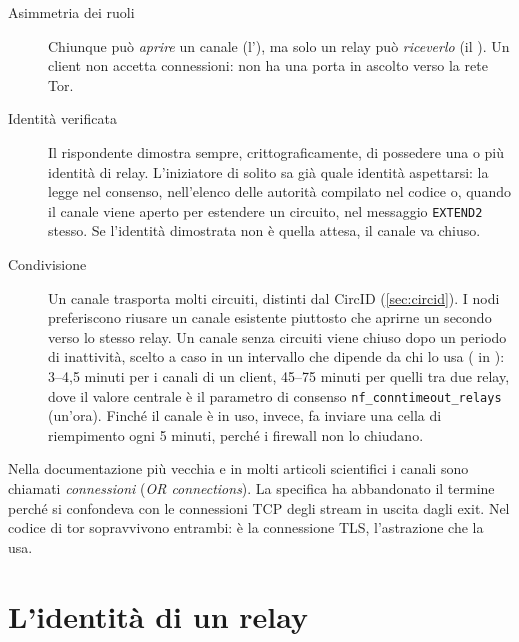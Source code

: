 \begin{description}
  \item[Asimmetria dei ruoli] Chiunque può \emph{aprire} un canale (l'), ma solo un relay può \emph{riceverlo} (il ). Un client non accetta connessioni: non ha una porta in ascolto verso la rete Tor.
  \item[Identità verificata] Il rispondente dimostra sempre, crittograficamente, di possedere una o più identità di relay. L'iniziatore di solito sa già quale identità aspettarsi: la legge nel consenso, nell'elenco delle autorità compilato nel codice o, quando il canale viene aperto per estendere un circuito, nel messaggio \texttt{EXTEND2} stesso. Se l'identità dimostrata non è quella attesa, il canale va chiuso.
  \item[Condivisione] Un canale trasporta molti circuiti, distinti dal CircID (\cref{sec:circid}). I nodi preferiscono riusare un canale esistente piuttosto che aprirne un secondo verso lo stesso relay. Un canale senza circuiti viene chiuso dopo un periodo di inattività, scelto a caso in un intervallo che dipende da chi lo usa ( in ): 3--4,5 minuti per i canali di un client, 45--75 minuti per quelli tra due relay, dove il valore centrale è il parametro di consenso \texttt{nf\_conntimeout\_relays} (un'ora). Finché il canale è in uso, invece,  fa inviare una cella di riempimento ogni 5 minuti, perché i firewall non lo chiudano.
\end{description}

\begin{approfondimento}
Nella documentazione più vecchia e in molti articoli scientifici i canali sono chiamati \emph{connessioni} (\emph{OR connections}). La specifica ha abbandonato il termine perché si confondeva con le connessioni TCP degli stream in uscita dagli exit. Nel codice di tor sopravvivono entrambi:  è la connessione TLS,  l'astrazione che la usa.
\end{approfondimento}

\section{L'identità di un relay}\label{sec:canale-chiavi}

